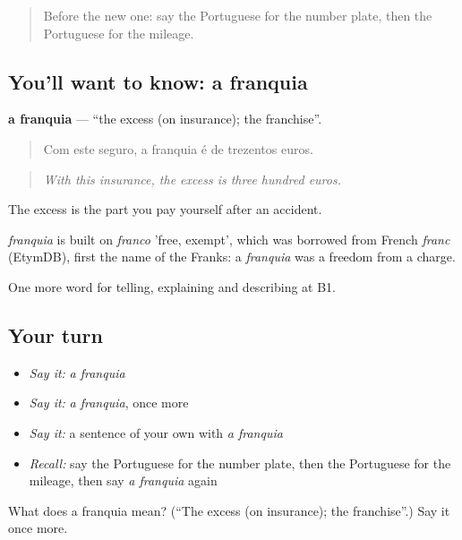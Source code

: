 \label{lesson:PT-C411-franquia}



\begin{quote}
Before the new one: say the Portuguese for the number plate, then the Portuguese for the mileage.
\end{quote}

\subsection*{You'll want to know: a franquia}
\textbf{a franquia} — \textquotedblleft{}the excess (on insurance); the franchise\textquotedblright{}.

\begin{quote}
Com este seguro, a franquia é de trezentos euros.
\end{quote}

\begin{quote}
\emph{With this insurance, the excess is three hundred euros.}
\end{quote}

The excess is the part you pay yourself after an accident.

\begin{cousinweb}
\emph{franquia} is built on \emph{franco} 'free, exempt', which was borrowed from French \emph{franc} (EtymDB), first the name of the Franks: a \emph{franquia} was a freedom from a charge.
\end{cousinweb}

\begin{grammarlens}[title={What you've built}]
One more word for telling, explaining and describing at B1.
\end{grammarlens}

\subsection*{Your turn}
\begin{itemize}
\raggedright
  \item \emph{Say it:} \emph{a franquia}
  \item \emph{Say it:} \emph{a franquia}, once more
  \item \emph{Say it:} a sentence of your own with \emph{a franquia}
  \item \emph{Recall:} say the Portuguese for the number plate, then the Portuguese for the mileage, then say \emph{a franquia} again
\end{itemize}

\begin{tcolorbox}[breakable,colback=teal!4,colframe=teal!35!black,title={Before you move on}]
What does a franquia mean? (\textquotedblleft{}The excess (on insurance); the franchise\textquotedblright{}.) Say it once more.
\end{tcolorbox}
